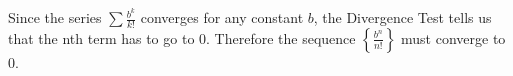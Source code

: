 \begin{enumerate}[leftmargin=0pt]
\begin{enumerate}
    \begin{red}
    Since the series $\sum \frac{b^k}{k!}$ converges for any constant $b$, the Divergence Test tells us that the nth term has to go to 0. Therefore the sequence $\left\{\frac{b^n}{n!}\right\}$ must converge to 0.
    \end{red}
\end{enumerate}

\end{enumerate}

